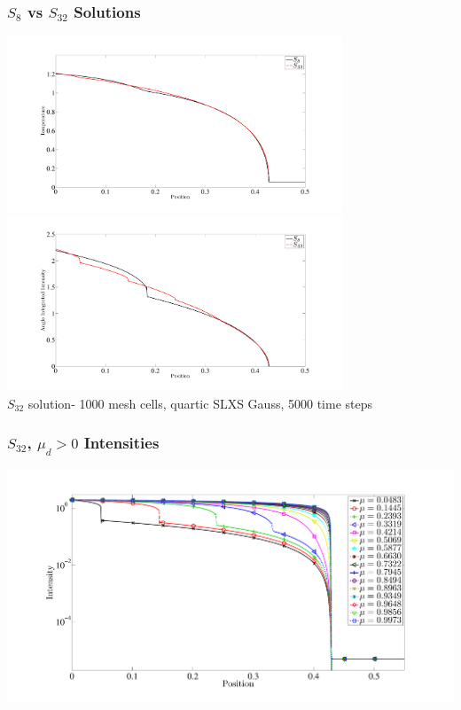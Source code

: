 \documentclass{beamer}
\begin{document}
\begin{frame}
\frametitle{$S_8$ vs $S_{32}$ Solutions}
\centering
\includegraphics[width=0.75\textwidth,height=0.4\textheight,trim=1.5in  0.2in 0.5in 0.75in,clip=true]{../chapter6_grey_radtran/Dissertation_Data/S8_vs_S32_Material_Temperature.pdf}
%
\\
\includegraphics[width=0.75\textwidth,height=0.4\textheight,trim=1.5in  0.2in 0.5in 0.75in,clip=true]{../chapter6_grey_radtran/Dissertation_Data/S8_vs_S32_Radiation.pdf}
\\
$S_{32}$ solution- 1000 mesh cells, quartic SLXS Gauss, 5000 time steps
\end{frame}

\begin{frame}
\frametitle{$S_{32}$, $\mu_d > 0$ Intensities}

\includegraphics[width=\textwidth,trim=1.5in  0.2in 0.5in 0.75in,clip=true]{../chapter6_grey_radtran/Dissertation_Data/S32_Intensity.pdf}

\end{frame}
\end{document}
